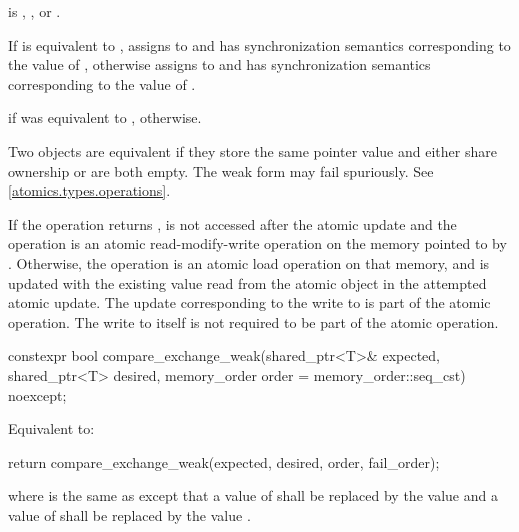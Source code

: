 \begin{itemdescr}
\pnum
\expects
{} is
,
, or
.

\pnum
\effects
If  is equivalent to ,
assigns  to  and
has synchronization semantics corresponding to the value of ,
otherwise assigns  to  and
has synchronization semantics corresponding to the value of .

\pnum
\returns
{} if  was equivalent to ,
 otherwise.

\pnum
\remarks
Two  objects are equivalent if
they store the same pointer value and
either share ownership or are both empty.
The weak form may fail spuriously. See \ref{atomics.types.operations}.

\pnum
If the operation returns ,
 is not accessed after the atomic update and
the operation is an atomic read-modify-write operation
on the memory pointed to by .
Otherwise, the operation is an atomic load operation on that memory, and
 is updated with the existing value
read from the atomic object in the attempted atomic update.
The  update corresponding to the write to 
is part of the atomic operation.
The write to  itself
is not required to be part of the atomic operation.
\end{itemdescr}

%
\begin{itemdecl}
constexpr bool compare_exchange_weak(shared_ptr<T>& expected, shared_ptr<T> desired,
                                     memory_order order = memory_order::seq_cst) noexcept;
\end{itemdecl}

\begin{itemdescr}
\pnum
\effects
Equivalent to:
\begin{codeblock}
return compare_exchange_weak(expected, desired, order, fail_order);
\end{codeblock}
where  is the same as 
except that a value of 
shall be replaced by the value  and
a value of 
shall be replaced by the value .
\end{itemdescr}

